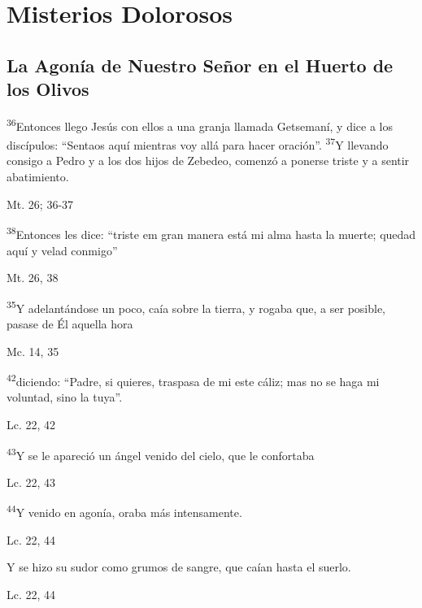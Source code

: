 \documentclass[a4paper,11pt]{article}
\begin{document}
    \newpage
        
  \section*{\hfil Misterios Dolorosos \hfil}
    \subsection*{\hfil La Agonía de Nuestro Señor en el Huerto de los Olivos \hfil}
      
      \textsuperscript{36}Entonces llego Jesús con ellos a una granja llamada Getsemaní, y dice a los discípulos: ``Sentaos aquí mientras voy allá para hacer oración''. 
      \textsuperscript{37}Y llevando consigo a Pedro y a los dos hijos de Zebedeo, comenzó a ponerse triste y a sentir abatimiento.
      \begin{center}
        Mt. 26; 36-37     
      \end{center}

      \textsuperscript{38}Entonces les dice: ``triste em gran manera está mi alma hasta la muerte; quedad aquí y velad conmigo''
      \begin{center}
        Mt. 26, 38
      \end{center}

      \textsuperscript{35}Y adelantándose un poco, caía sobre la tierra, y rogaba que, a ser posible, pasase de Él aquella hora
      \begin{center}
        Mc. 14, 35  
      \end{center}

      \textsuperscript{42}diciendo: ``Padre, si quieres, traspasa de mi este cáliz; mas no se haga mi voluntad, sino la tuya''.
      \begin{center}
        Lc. 22, 42
      \end{center}

      \textsuperscript{43}Y se le apareció un ángel venido del cielo, que le confortaba
      \begin{center}
        Lc. 22, 43
      \end{center}

      \textsuperscript{44}Y venido en agonía, oraba más intensamente. 
      \begin{center}
        Lc. 22, 44
      \end{center}

      Y se hizo su sudor como grumos de sangre, que caían hasta el suerlo.
      \begin{center}
        Lc. 22, 44
      \end{center}
\end{document}
